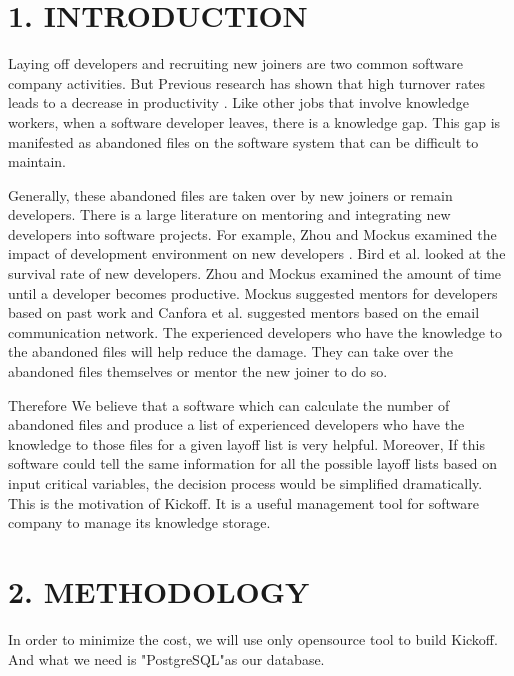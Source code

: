 \documentclass[12pt, a4paper, openright]{report}
\begin{document}
\section*{1. INTRODUCTION}
Laying off developers and recruiting new joiners are two common software company activities. But Previous research has shown that high turnover rates leads to a decrease in productivity \cite{Guthrie2001AMJ}. 
Like other jobs that involve knowledge workers, 
when a software developer leaves, there is a knowledge gap. This gap is manifested as abandoned
files on the software system that can be difficult to maintain.


Generally, these abandoned files are taken over by new joiners or remain developers. There is a large literature on mentoring and integrating new developers into software projects. For example, Zhou and Mockus examined the impact of development environment on new developers\cite{Zhou2011ICSE} . Bird et al. \cite{Bird2007MSR} looked at the survival rate of new developers. Zhou and Mockus examined the amount of time until a developer becomes productive. Mockus \cite{Mockus2010FSE} suggested mentors for developers based on past work and Canfora et al. \cite{Canfora2012FSE} suggested mentors based on the email communication network. The experienced developers who have the knowledge to the abandoned files will help reduce the damage. They can take over the abandoned files themselves or mentor the new joiner to do so.


Therefore We believe that a software which can calculate the number of abandoned files and produce a list of experienced  developers who have the knowledge to those files for a given layoff list is very helpful. Moreover, If this software could tell the same information for all the possible 
layoff lists based on input critical variables, the decision process would be simplified dramatically. This is the motivation of Kickoff. It is a useful management tool for software company to manage its knowledge storage.



\newpage
\section*{2. METHODOLOGY}

In order to minimize the cost, we will use only opensource tool to build Kickoff. And what we need is "PostgreSQL"as our database.
\end{document}
